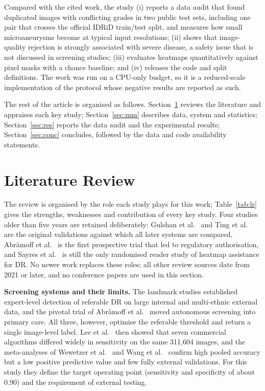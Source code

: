 \documentclass[11pt,a4paper]{article}
\begin{document}
Compared with the cited work, the study (i) reports a data audit that found duplicated images with conflicting grades in two public test sets, including one pair that crosses the official IDRiD train/test split, and measures how small microaneurysms become at typical input resolutions; (ii) shows that image-quality rejection is strongly associated with severe disease, a safety issue that is not discussed in screening studies; (iii) evaluates heatmaps quantitatively against pixel masks with a chance baseline; and (iv) releases the code and split definitions. The work was run on a CPU-only budget, so it is a reduced-scale implementation of the protocol whose negative results are reported as such.

The rest of the article is organised as follows. Section~\ref{sec:lr} reviews the literature and appraises each key study; Section~\ref{sec:mm} describes data, system and statistics; Section~\ref{sec:res} reports the data audit and the experimental results; Section~\ref{sec:conc} concludes, followed by the data and code availability statements.

\section{Literature Review}\label{sec:lr}
The review is organised by the role each study plays for this work; Table~\ref{tab:lr} gives the strengths, weaknesses and contribution of every key study. Four studies older than five years are retained deliberately: Gulshan et al.\ \cite{gulshan2016} and Ting et al.\ \cite{ting2017} are the original validations against which all later systems are compared, Abr\`amoff et al.\ \cite{abramoff2018} is the first prospective trial that led to regulatory authorisation, and Sayres et al.\ \cite{sayres2019} is still the only randomised reader study of heatmap assistance for DR. No newer work replaces these roles; all other review sources date from 2021 or later, and no conference papers are used in this section.

\textbf{Screening systems and their limits.} The landmark studies \cite{gulshan2016,ting2017} established expert-level detection of referable DR on large internal and multi-ethnic external data, and the pivotal trial of Abr\`amoff et al.\ \cite{abramoff2018} moved autonomous screening into primary care. All three, however, optimise the referable threshold and return a single image-level label. Lee et al.\ \cite{lee2021} then showed that seven commercial algorithms differed widely in sensitivity on the same 311{,}604 images, and the meta-analyses of Wewetzer et al.\ \cite{wewetzer2021} and Wang et al.\ \cite{wang2026} confirm high pooled accuracy but a low positive predictive value and few fully external validations. For this study they define the target operating point (sensitivity and specificity of about 0.90) and the requirement of external testing.
\end{document}
